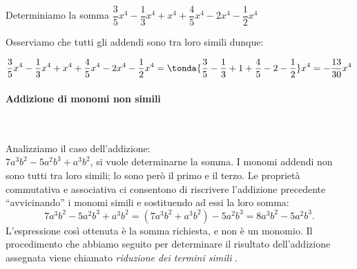 
% 
% 
% 
% 
% 

\begin{esempio}{}{}
Determiniamo la somma 
\quad 
\(\dfrac{3}{5}x^{4}-\dfrac{1}{3}x^{4}+x^{4}+
  \dfrac{4}{5}x^{4}-2x^{4}-\dfrac{1}{2}x^{4}\)

\vspace{.5em}
Osserviamo che tutti gli addendi sono tra loro simili dunque:

\vspace{-1.5em}
\[\frac{3}{5}x^{4}-\frac{1}{3}x^{4}+x^{4}+
  \frac{4}{5}x^{4}-2x^{4}-\frac{1}{2}x^{4}=
  \tonda{\frac{3}{5}-\frac{1}{3}+1+\frac{4}{5}-2-\frac{1}{2}}x^{4}=
  -{\frac{13}{30}}x^{4}\]
\end{esempio}

\paragraph{Addizione di monomi non simili}
~

Analizziamo il caso dell'addizione:\\
\(7a^{3}b^{2}-5a^{2}b^{3}+a^{3}b^{2}\), si vuole determinarne la somma. 
I monomi addendi non sono tutti tra loro simili; 
lo sono però il primo e il terzo. 
Le proprietà commutativa e associativa ci consentono di riscrivere
l'addizione precedente ``avvicinando'' i monomi simili e
sostituendo ad essi la loro somma:
\[7a^{3}b^{2}-5a^{2}b^{3}+a^{3}b^{2}=(7a^{3}b^{2}+a^{3}b^{2})-5a^{2}b^{3}
=8a^{3}b^{2}-5a^{2}b^{3}.\]
L'espressione così ottenuta è la somma richiesta, e non è un monomio.
Il procedimento che abbiamo seguito per determinare il risultato
dell'addizione assegnata viene chiamato 
\emph{riduzione dei termini simili}
.

